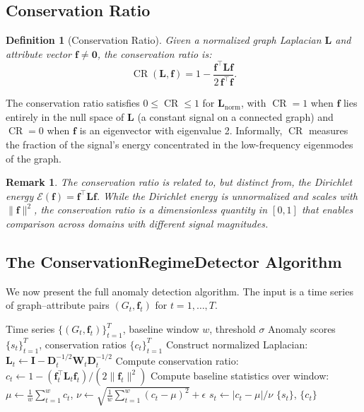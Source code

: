 \documentclass[11pt,a4paper]{article}
\newtheorem{definition}[theorem]{Definition}
\newtheorem{remark}{Remark}[section]
\newcommand{\bff}{\mathbf{f}}
\newcommand{\bL}{\mathbf{L}}
\newcommand{\bW}{\mathbf{W}}
\newcommand{\bD}{\mathbf{D}}
\DeclareMathOperator{\CR}{CR}
\begin{document}
\subsection{Conservation Ratio}

\begin{definition}[Conservation Ratio]
Given a normalized graph Laplacian $\bL$ and attribute vector $\bff \neq \mathbf{0}$,
the \emph{conservation ratio} is:
\begin{equation}
  \CR(\bL, \bff) = 1 - \frac{\bff^\top \bL \bff}{2\,\bff^\top \bff}.
\end{equation}
\end{definition}

The conservation ratio satisfies $0 \leq \CR \leq 1$ for $\bL_{\mathrm{norm}}$,
with $\CR = 1$ when $\bff$ lies entirely in the null space of $\bL$ (a constant
signal on a connected graph) and $\CR = 0$ when $\bff$ is an eigenvector with
eigenvalue 2.  Informally, $\CR$ measures the fraction of the signal's energy
concentrated in the low-frequency eigenmodes of the graph.

\begin{remark}
The conservation ratio is related to, but distinct from, the Dirichlet energy
$\mathcal{E}(\bff) = \bff^\top \bL \bff$.  While the Dirichlet energy is
unnormalized and scales with $\|\bff\|^2$, the conservation ratio is a
dimensionless quantity in $[0,1]$ that enables comparison across domains with
different signal magnitudes.
\end{remark}

\subsection{The ConservationRegimeDetector Algorithm}

We now present the full anomaly detection algorithm.  The input is a time series
of graph--attribute pairs $(G_t, \bff_t)$ for $t = 1, \ldots, T$.

\begin{algorithm}[ht]
\caption{ConservationRegimeDetector}\label{alg:crd}
\begin{algorithmic}[1]
  \Require Time series $\{(G_t, \bff_t)\}_{t=1}^T$, baseline window $w$, threshold $\sigma$
  \Ensure Anomaly scores $\{s_t\}_{t=1}^T$, conservation ratios $\{c_t\}_{t=1}^T$
  \Statex
    \State Construct normalized Laplacian: $\bL_t \leftarrow \mathbf{I} - \bD_t^{-1/2}\bW_t\bD_t^{-1/2}$
    \State Compute conservation ratio: $c_t \leftarrow 1 - (\bff_t^\top \bL_t \bff_t) / (2\|\bff_t\|^2)$
  \EndFor
  \Statex
  \State Compute baseline statistics over window:
    $\mu \leftarrow \frac{1}{w}\sum_{t=1}^{w} c_t$, \quad
    $\nu \leftarrow \sqrt{\frac{1}{w}\sum_{t=1}^{w}(c_t - \mu)^2} + \epsilon$
  \Statex
    \State $s_t \leftarrow |c_t - \mu| / \nu$ 
  \EndFor
  \Statex
  \State \Return $\{s_t\}$, $\{c_t\}$
\end{algorithmic}
\end{algorithm}
\end{document}
